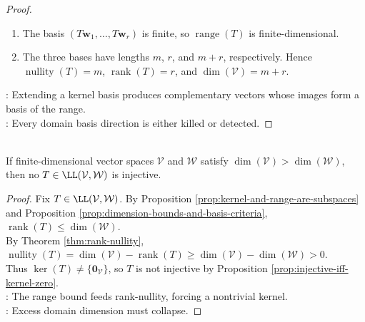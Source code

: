 \begin{theorem}
\begin{proof}
\begin{enumerate}[label=(\roman*)]
\setlength{\itemsep}{0pt}
\item The basis $(T\mathbf{w}_1,\ldots,T\mathbf{w}_r)$ is finite, so $\operatorname{range}(T)$ is finite-dimensional.
\item The three bases have lengths $m$, $r$, and $m+r$, respectively. Hence $\operatorname{nullity}(T)=m$, $\operatorname{rank}(T)=r$, and $\dim(\mathcal{V})=m+r$.
\end{enumerate}
: Extending a kernel basis produces complementary vectors whose images form a basis of the range.\\
: Every domain basis direction is either killed or detected.
\end{proof}
\end{theorem}

\begin{corollary} \label{cor:map-to-smaller-space-not-injective} \\
If finite-dimensional vector spaces $\mathcal{V}$ and $\mathcal{W}$ satisfy $\dim(\mathcal{V})>\dim(\mathcal{W})$, then no $T\in\LL(\mathcal{V},\mathcal{W})$ is injective.
\begin{proof}
Fix $T\in\LL(\mathcal{V},\mathcal{W})$. By Proposition \ref{prop:kernel-and-range-are-subspaces} and Proposition \ref{prop:dimension-bounds-and-basis-criteria}, $\operatorname{rank}(T)\leq\dim(\mathcal{W})$.\\
By Theorem \ref{thm:rank-nullity}, $\operatorname{nullity}(T)=\dim(\mathcal{V})-\operatorname{rank}(T)\geq\dim(\mathcal{V})-\dim(\mathcal{W})>0$.\\
Thus $\ker(T)\neq\{\mathbf{0}_{\mathcal{V}}\}$, so $T$ is not injective by Proposition \ref{prop:injective-iff-kernel-zero}.\\
: The range bound feeds rank-nullity, forcing a nontrivial kernel.\\
: Excess domain dimension must collapse.
\end{proof}
\end{corollary}


